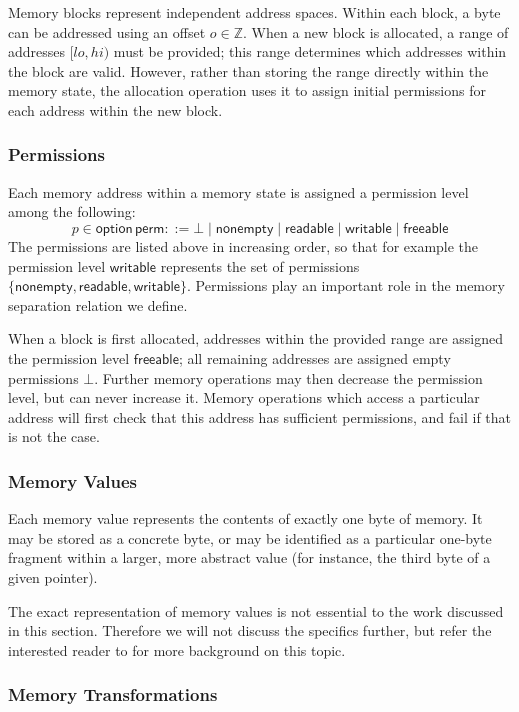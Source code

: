 \documentclass[acmsmall,screen,review,anonymous,nonacm]{acmart}
\newcommand{\kw}[1]{\ensuremath{ \mathsf{#1} }}
\begin{document}
Memory blocks represent independent address spaces.
Within each block,
a byte can be addressed using an offset $o \in \mathbb{Z}$.
When a new block is allocated,
a range of addresses $[\mathit{lo}, \mathit{hi})$ must be provided;
this range determines which addresses within the block are valid.
However,
rather than storing the range directly within the memory state,
the allocation operation uses it to assign initial permissions
for each address within the new block.

\subsubsection{Permissions}

Each memory address within a memory state
is assigned a permission level among the following:
\[
  p \in \kw{option}\,\kw{perm} ::=
    \bot \mid
    \kw{nonempty} \mid
    \kw{readable} \mid
    \kw{writable} \mid
    \kw{freeable}
\]
The permissions are listed above in increasing order,
so that for example the permission level $\kw{writable}$ 
represents the set of permissions
$\{ \kw{nonempty}, \kw{readable}, \kw{writable} \}$.
Permissions play an important role
in the memory separation relation we define.

When a block is first allocated,
addresses within the provided range
are assigned the permission level $\kw{freeable}$;
all remaining addresses are assigned
empty permissions $\bot$.
Further memory operations may then decrease the permission level,
but can never increase it.
Memory operations which access a particular address
will first check that this address has sufficient permissions,
and fail if that is not the case.

\subsubsection{Memory Values}

Each memory value represents the contents of exactly one byte of memory.
It may be stored as a concrete byte,
or may be identified as a particular one-byte fragment
within a larger, more abstract value
(for instance, the third byte of a given pointer).

The exact representation of memory values
is not essential to the work discussed in this section.
Therefore
we will not discuss the specifics further,
but refer the interested reader to \citet{compcertmmv2}
for more background on this topic.

\subsubsection{Memory Transformations}
\end{document}
